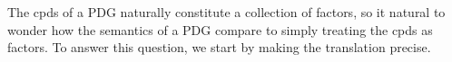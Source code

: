 \documentclass{article}
\begin{document}
	The cpds of a PDG naturally constitute a collection of factors,
	so it natural to wonder how the semantics of a PDG compare to 
	simply treating the cpds as factors. To answer this question, we start by making
	the translation precise.
\end{document}

